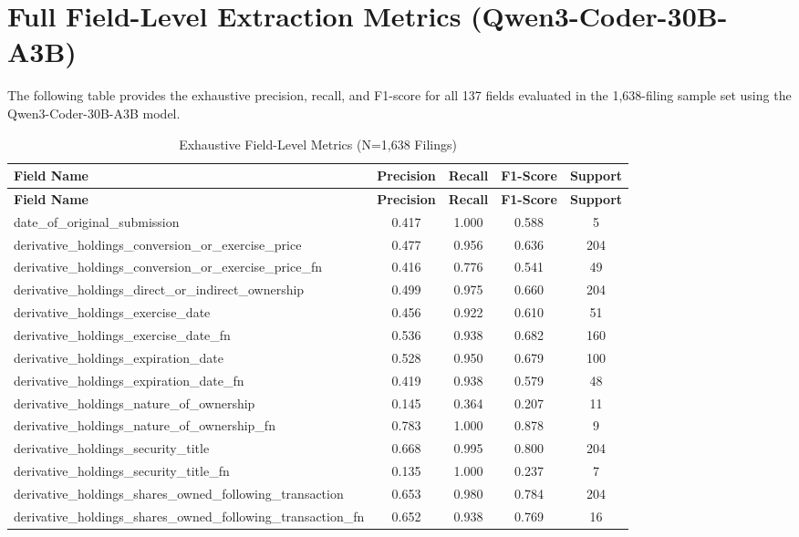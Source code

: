 \documentclass[journal, onecolumn]{IEEEtran}
\begin{document}
\newpage
\section{Full Field-Level Extraction Metrics (Qwen3-Coder-30B-A3B)}
The following table provides the exhaustive precision, recall, and F1-score for all 137 fields evaluated in the 1,638-filing sample set using the Qwen3-Coder-30B-A3B model.

\begin{small}
\begin{longtable}{lcccc}
\caption{Exhaustive Field-Level Metrics (N=1,638 Filings)} \label{tab:full_metrics} \\
\toprule
\textbf{Field Name} & \textbf{Precision} & \textbf{Recall} & \textbf{F1-Score} & \textbf{Support} \\
\midrule
\endfirsthead
\toprule
\textbf{Field Name} & \textbf{Precision} & \textbf{Recall} & \textbf{F1-Score} & \textbf{Support} \\
\midrule
\endhead
\bottomrule
\endfoot
date\_of\_original\_submission & 0.417 & 1.000 & 0.588 & 5 \\
derivative\_holdings\_conversion\_or\_exercise\_price & 0.477 & 0.956 & 0.636 & 204 \\
derivative\_holdings\_conversion\_or\_exercise\_price\_fn & 0.416 & 0.776 & 0.541 & 49 \\
derivative\_holdings\_direct\_or\_indirect\_ownership & 0.499 & 0.975 & 0.660 & 204 \\
derivative\_holdings\_exercise\_date & 0.456 & 0.922 & 0.610 & 51 \\
derivative\_holdings\_exercise\_date\_fn & 0.536 & 0.938 & 0.682 & 160 \\
derivative\_holdings\_expiration\_date & 0.528 & 0.950 & 0.679 & 100 \\
derivative\_holdings\_expiration\_date\_fn & 0.419 & 0.938 & 0.579 & 48 \\
derivative\_holdings\_nature\_of\_ownership & 0.145 & 0.364 & 0.207 & 11 \\
derivative\_holdings\_nature\_of\_ownership\_fn & 0.783 & 1.000 & 0.878 & 9 \\
derivative\_holdings\_security\_title & 0.668 & 0.995 & 0.800 & 204 \\
derivative\_holdings\_security\_title\_fn & 0.135 & 1.000 & 0.237 & 7 \\
derivative\_holdings\_shares\_owned\_following\_transaction & 0.653 & 0.980 & 0.784 & 204 \\
derivative\_holdings\_shares\_owned\_following\_transaction\_fn & 0.652 & 0.938 & 0.769 & 16 \\

\end{longtable}
\end{small}
\end{document}
